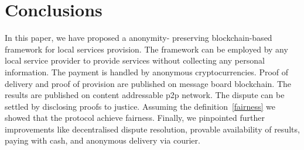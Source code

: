 \documentclass{ieeeaccess}
\begin{document}
\section{Conclusions}
In this paper, we have proposed a anonymity- preserving blockchain-based framework for local services provision. The framework can be employed by any local service provider to provide services without collecting any personal information. The payment is handled by anonymous cryptocurrencies. Proof of delivery and proof of provision are published on message board blockchain. The results are published on content addressable p2p network. The dispute can be settled by disclosing proofs to justice. Assuming the definition~\ref{fairness} we showed that the protocol achieve fairness. Finally, we pinpointed further improvements like decentralised dispute resolution, provable  availability of results, paying with cash, and anonymous delivery via courier.



\EOD
\end{document}
